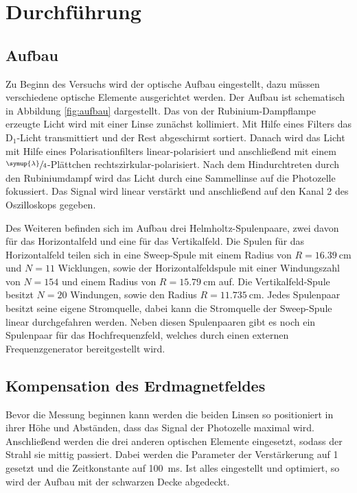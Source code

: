 \newpage
\section{Durchführung}
\label{sec:Durchführung}
\subsection{Aufbau}
\label{sec:aufbau}
Zu Beginn des Versuchs wird der optische Aufbau eingestellt, dazu müssen verschiedene optische Elemente 
ausgerichtet werden.
Der Aufbau ist schematisch in Abbildung \ref{fig:aufbau} dargestellt. Das von der Rubinium-Dampflampe
erzeugte Licht wird mit einer Linse zunächst kollimiert. Mit Hilfe eines Filters das $\text{D}_1$-Licht
transmittiert und der Rest abgeschirmt sortiert. Danach wird das Licht mit Hilfe eines Polarisationfilters
linear-polarisiert und anschließend mit einem $\sfrac{\symup{\lambda}}{4}$-Plättchen rechtszirkular-polarisiert.
Nach dem Hindurchtreten durch den Rubiniumdampf wird das Licht durch eine Sammellinse auf die Photozelle
fokussiert. Das Signal wird linear verstärkt und anschließend auf den Kanal 2 des Oszilloskops gegeben.

Des Weiteren befinden sich im Aufbau drei Helmholtz-Spulenpaare, zwei davon für das Horizontalfeld und eine für das Vertikalfeld.
Die Spulen für das Horizontalfeld teilen sich in eine Sweep-Spule mit einem Radius von $R=\SI{16.39}{\centi\meter}$ und
$N=\num{11}$ Wicklungen, sowie der Horizontalfeldspule mit einer Windungszahl von $N=\num{154}$ und einem 
Radius von $R=\SI{15.79}{\centi\meter}$ auf. Die Vertikalfeld-Spule besitzt $N=\num{20}$ Windungen, 
sowie den Radius $R=\SI{11.735}{\centi\meter}$. Jedes Spulenpaar besitzt seine eigene Stromquelle, dabei kann die Stromquelle der
Sweep-Spule linear durchgefahren werden.
Neben diesen Spulenpaaren gibt es noch ein Spulenpaar für das Hochfrequenzfeld, welches durch einen externen Frequenzgenerator
bereitgestellt wird.

\subsection{Kompensation des Erdmagnetfeldes}
\label{sec:erdmagnetfeld}
Bevor die Messung beginnen kann werden die beiden Linsen so positioniert in ihrer Höhe und Abständen, dass das Signal der Photozelle
maximal wird. Anschließend werden die drei anderen optischen Elemente eingesetzt, sodass der Strahl sie mittig passiert. Dabei werden
die Parameter der Verstärkerung auf \num{1} gesetzt und die Zeitkonstante auf \SI{100}{\milli\second}. Ist alles eingestellt und optimiert,
so wird der Aufbau mit der schwarzen Decke abgedeckt.

